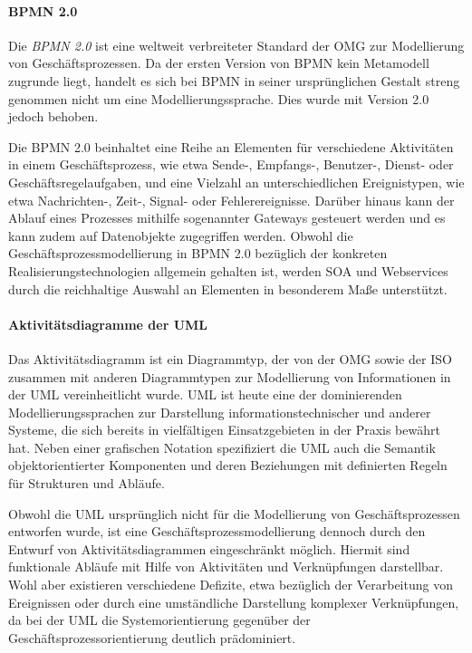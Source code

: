 \paragraph{\acl{BPMN} 2.0}
Die \textit{\acf{BPMN} 2.0} ist eine weltweit verbreiteter Standard der \ac{OMG} zur Modellierung von Geschäftsprozessen.
Da der ersten Version von \ac{BPMN} kein Metamodell zugrunde liegt, handelt es sich bei \ac{BPMN} in seiner ursprünglichen Gestalt streng genommen nicht um eine Modellierungssprache. Dies wurde  mit Version 2.0 jedoch behoben. 
\cite{OMG.2014}

Die \ac{BPMN} 2.0 beinhaltet eine Reihe an Elementen für verschiedene Aktivitäten in einem Geschäftsprozess, wie etwa Sende-, Empfangs-, Benutzer-, Dienst- oder Geschäftsregelaufgaben, und eine Vielzahl an unterschiedlichen Ereignistypen, wie etwa Nachrichten-, Zeit-, Signal- oder Fehlerereignisse. 
Darüber hinaus kann der Ablauf eines Prozesses mithilfe sogenannter Gateways gesteuert werden und es kann zudem auf Datenobjekte zugegriffen werden. 
\cite{Weidlich.2010}
Obwohl die Geschäftsprozessmodellierung in \ac{BPMN} 2.0 bezüglich der konkreten Realisierungstechnologien allgemein gehalten ist, werden \ac{SOA} und Webservices durch die reichhaltige Auswahl an Elementen in besonderem Maße unterstützt.
\cite{Jobst.2010}

\paragraph{Aktivitätsdiagramme der \acl{UML}}
Das Aktivitätsdiagramm ist ein Diagrammtyp, der von der \ac{OMG} sowie der \ac{ISO} zusammen mit anderen Diagrammtypen zur Modellierung von Informationen in der \acf{UML} vereinheitlicht wurde.
\cite{OMG.2014}\cite{ISO.2012}
\ac{UML} ist heute eine der dominierenden Modellierungssprachen zur Darstellung informationstechnischer und anderer Systeme, die sich bereits in vielfältigen Einsatzgebieten in der Praxis bewährt hat.
Neben einer grafischen Notation spezifiziert die \ac{UML} auch die Semantik objektorientierter Komponenten und deren Beziehungen mit definierten Regeln für Strukturen und Abläufe.
\cite{Rumpe.2011}

Obwohl die \ac{UML} ursprünglich nicht für die Modellierung von Geschäftsprozessen entworfen wurde, ist eine Geschäftsprozessmodellierung dennoch durch den Entwurf von Aktivitätsdiagrammen eingeschränkt möglich. 
Hiermit sind funktionale Abläufe mit Hilfe von Aktivitäten und Verknüpfungen darstellbar. 
\cite{vanRanden.2016}
Wohl aber existieren verschiedene Defizite, etwa bezüglich der Verarbeitung von Ereignissen oder durch eine umständliche Darstellung komplexer Verknüpfungen, da bei der \ac{UML} die Systemorientierung gegenüber der Geschäftsprozessorientierung deutlich prädominiert.
\cite{Staud.2006}

